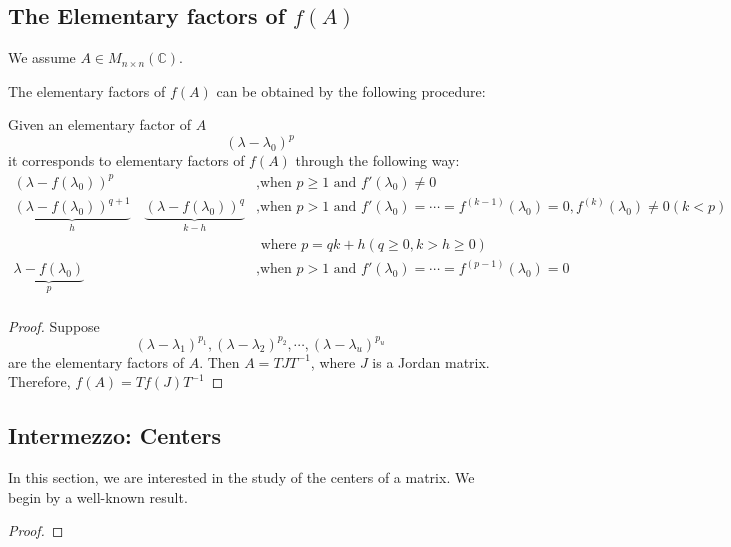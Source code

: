 \subsection{The Elementary factors of $f(A)$}
We assume $A\in M_{n\times n}(\mathbb{C})$.
\begin{theorem}
The elementary factors of $f(A)$ can be obtained by the following procedure:\par
Given an elementary factor of $A$ \[(\lambda-\lambda_0)^p\]
it corresponds to elementary factors of $f(A)$ through the following way:
\begin{align*}
    (\lambda-f(\lambda_0))^p &\text{,when } p\ge 1\text{ and }f'(\lambda_0)\ne 0\\
    \underbrace{(\lambda-f(\lambda_0))^{q+1}}_h \quad \underbrace{(\lambda-f(\lambda_0))^q}_{k-h}&\text{,when } p>1\text{ and }f'(\lambda_0)=\cdots=f^{(k-1)}(\lambda_0)=0,f^{(k)}(\lambda_0)\ne 0(k<p)\\
    &\text{ where }p=qk+h(q\ge0,k>h\ge0)\\
    \underbrace{\lambda-f(\lambda_0)} _{ p} &\text{,when }p>1\text{ and }f'(\lambda_0)=\cdots=f^{(p-1)}(\lambda_0)=0\\
\end{align*}
\end{theorem}
\begin{proof}
 Suppose 
\[(\lambda-\lambda_1)^{p_1},(\lambda-\lambda_2)^{p_2},\cdots,(\lambda-\lambda_u)^{p_u}\]
are the elementary factors of $A$. Then $A=TJT^{-1}$, where $J$ is a Jordan matrix. Therefore, $f(A)=Tf(J)T^{-1}$
\end{proof}



\subsection{Intermezzo: Centers}
In this section, we are interested in the study of the centers of a matrix. We begin by a well-known result.
\begin{theorem}

\end{theorem}
\begin{proof}

\end{proof}

